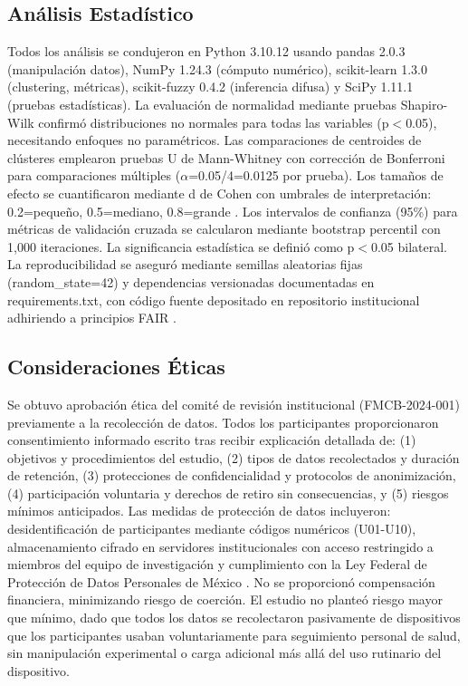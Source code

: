 \documentclass[journal,twoside,web]{ieeecolor}
\begin{document}
\subsection{Análisis Estadístico}
\label{subsec:estadistica}

Todos los análisis se condujeron en Python 3.10.12 usando pandas 2.0.3 (manipulación datos), NumPy 1.24.3 (cómputo numérico), scikit-learn 1.3.0 (clustering, métricas), scikit-fuzzy 0.4.2 (inferencia difusa) y SciPy 1.11.1 (pruebas estadísticas). La evaluación de normalidad mediante pruebas Shapiro-Wilk \cite{Shapiro1965} confirmó distribuciones no normales para todas las variables (p$<$0.05), necesitando enfoques no paramétricos. Las comparaciones de centroides de clústeres emplearon pruebas U de Mann-Whitney \cite{Mann1947} con corrección de Bonferroni para comparaciones múltiples ($\alpha$=0.05/4=0.0125 por prueba). Los tamaños de efecto se cuantificaron mediante d de Cohen con umbrales de interpretación: 0.2=pequeño, 0.5=mediano, 0.8=grande \cite{Cohen1988}. Los intervalos de confianza (95\%) para métricas de validación cruzada se calcularon mediante bootstrap percentil con 1,000 iteraciones. La significancia estadística se definió como p$<$0.05 bilateral. La reproducibilidad se aseguró mediante semillas aleatorias fijas (random\_state=42) y dependencias versionadas documentadas en requirements.txt, con código fuente depositado en repositorio institucional adhiriendo a principios FAIR \cite{Wilkinson2016}.

\subsection{Consideraciones Éticas}
\label{subsec:etica}

Se obtuvo aprobación ética del comité de revisión institucional (FMCB-2024-001) previamente a la recolección de datos. Todos los participantes proporcionaron consentimiento informado escrito tras recibir explicación detallada de: (1) objetivos y procedimientos del estudio, (2) tipos de datos recolectados y duración de retención, (3) protecciones de confidencialidad y protocolos de anonimización, (4) participación voluntaria y derechos de retiro sin consecuencias, y (5) riesgos mínimos anticipados. Las medidas de protección de datos incluyeron: desidentificación de participantes mediante códigos numéricos (U01-U10), almacenamiento cifrado en servidores institucionales con acceso restringido a miembros del equipo de investigación y cumplimiento con la Ley Federal de Protección de Datos Personales de México \cite{Liu2022}. No se proporcionó compensación financiera, minimizando riesgo de coerción. El estudio no planteó riesgo mayor que mínimo, dado que todos los datos se recolectaron pasivamente de dispositivos que los participantes usaban voluntariamente para seguimiento personal de salud, sin manipulación experimental o carga adicional más allá del uso rutinario del dispositivo.
\end{document}
